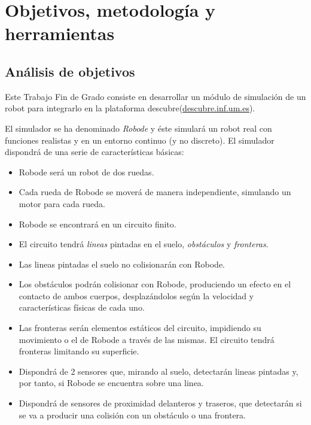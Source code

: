 \chapter{Objetivos, metodología y herramientas}
\label{objetivos-metodologia-herramientas}

\section{Análisis de objetivos}
\label{sec:objetivos}

Este Trabajo Fin de Grado consiste en desarrollar un módulo de simulación de un robot para integrarlo en la plataforma \Gls{descubre}(\url{descubre.inf.um.es}).

El simulador se ha denominado \emph{Robode} y éste simulará un robot real con funciones realistas y en un entorno continuo (y no discreto). El simulador dispondrá de una serie de características básicas:
\begin{itemize}
	\item Robode será un robot de dos ruedas.
	\item Cada rueda de Robode se moverá de manera independiente, simulando un motor para cada rueda. 
	\item Robode se encontrará en un circuito finito. 
	\item El circuito tendrá \emph{lineas} pintadas en el suelo, \emph{obstáculos} y \emph{fronteras}.
	\item Las lineas pintadas el suelo no colisionarán con Robode.
	\item Los obstáculos podrán colisionar con Robode, produciendo un efecto en el contacto de ambos cuerpos, desplazándolos según la velocidad y características físicas de cada uno.
	\item Las fronteras serán elementos estáticos del circuito, impidiendo su movimiento o el de Robode a través de las mismas. El circuito tendrá fronteras limitando su superficie.
	\item Dispondrá de 2 sensores que, mirando al suelo, detectarán lineas pintadas y, por tanto, si Robode se encuentra sobre una linea.
	\item Dispondrá de sensores de proximidad delanteros y traseros, que detectarán si se va a producir una colisión con un obstáculo o una frontera.
\end{itemize}


